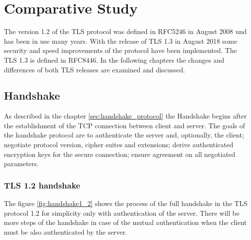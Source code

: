 \chapter{Comparative Study}
\label{chap:comparative_study}

The version 1.2 of the TLS protocol was defined in RFC5246 in August 2008 und has been in use many years. With the release of TLS 1.3 in August 2018 some security and speed improvements of the protocol have been implemented. The TLS 1.3 is defined in RFC8446. In the following chapters the changes and differences of both TLS releases are examined and discussed.

\section{Handshake}
\label{sec:comparison_handshake}

As described in the chapter \ref{sec:handshake_protocol} the Handshake begins after the establishment of the TCP connection between client and server. The goals of the handshake protocol are to authenticate the server and, optionally, the client; negotiate protocol version, cipher suites and extensions; derive authenticated encryption keys for the secure connection; ensure agreement on all negotiated parameters. \cite{Hassenstein}

\subsection{TLS 1.2 handshake}
\label{subsec:handshake1_2}

The figure \ref{fig:handshake1_2} shows the process of the full handshake in the TLS protocol 1.2 for simplicity only with authentication of the server. There will be more steps of the handshake in case of the mutual authentication when the client must be also authenticated by the server.

